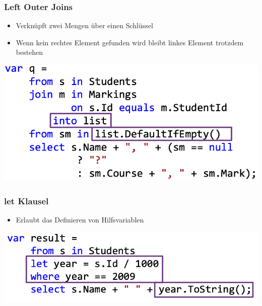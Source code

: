 \subsubsection{Left Outer Joins}
\begin{itemize}
    \item Verknüpft zwei Mengen über einen Schlüssel
    \item Wenn kein rechtes Element gefunden wird bleibt linkes Element trotzdem bestehen
\end{itemize}
\vspace{-8pt}
\begin{center}
    \includegraphics[scale=.3]{graphic/linq/Left Outer Joins.png}
\end{center}
\vspace{-8pt}

\subsubsection{let Klausel}
\begin{itemize}
    \item Erlaubt das Definieren von Hilfsvariablen
\end{itemize}
\vspace{-8pt}
\begin{center}
    \includegraphics[scale=.3]{graphic/linq/let Klausel.png}
\end{center}
\vspace{-8pt}

